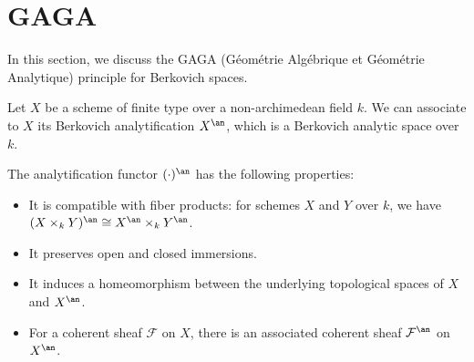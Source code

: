 \section{GAGA}
    
    In this section, we discuss the GAGA (Géométrie Algébrique et Géométrie Analytique) principle for Berkovich spaces.

    \begin{construction}\label{constr:Berkovich_analytification_functor}
        Let \(X\) be a scheme of finite type over a non-archimedean field \(k\). 
        We can associate to \(X\) its Berkovich analytification \(X^{\an}\), which is a Berkovich analytic space over \(k\).

        The analytification functor \( (\cdot)^{\an} \) has the following properties:   
        \begin{itemize}
            \item It is compatible with fiber products: for schemes \(X\) and \(Y\) over \(k\), we have \((X \times_k Y)^{\an} \cong X^{\an} \times_k Y^{\an}\).
            \item It preserves open and closed immersions.
            \item It induces a homeomorphism between the underlying topological spaces of \(X\) and \(X^{\an}\).
            \item For a coherent sheaf \(\mathcal{F}\) on \(X\), there is an associated coherent sheaf \(\mathcal{F}^{\an}\) on \(X^{\an}\).
        \end{itemize}
    \end{construction}